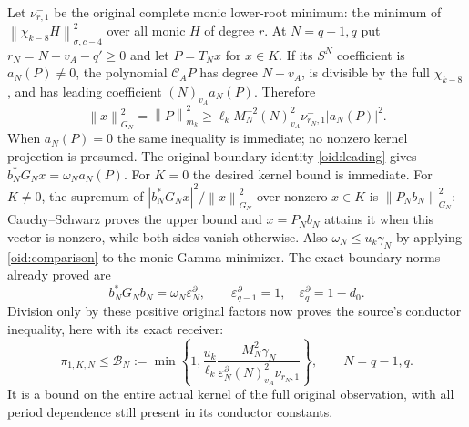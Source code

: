 \documentclass[11pt,a4paper]{article}
\newcommand{\norm}[1]{\left\lVert#1\right\rVert}
\begin{document}
Let $\nu^-_{r,1}$ be the original complete monic lower-root minimum:
the minimum of
$\norm{\chi_{k-8}H}_{\sigma,c-4}^2$ over all monic $H$ of degree
$r$. At $N=q-1,q$ put $r_N=N-v_A-q'\ge0$ and let
$P=T_Nx$ for $x\in K$. If its $S^N$ coefficient is $a_N(P)\ne0$,
the polynomial $\mathcal C_AP$ has degree $N-v_A$, is divisible
by the full $\chi_{k-8}$, and has leading coefficient
$(N)_{v_A}a_N(P)$. Therefore
\begin{equation}\label{oid:kernelcoefficient}
 \norm{x}_{G_N}^2=\norm P_{m_k}^2
 \ge\ell_k M_N^{-2}(N)_{v_A}^2
 \nu^-_{r_N,1}|a_N(P)|^2.
\end{equation}
When $a_N(P)=0$ the same inequality is immediate; no nonzero kernel
projection is presumed. The original boundary identity
\eqref{oid:leading} gives
$b_N^*G_Nx=\omega_Na_N(P)$.
For $K=0$ the desired kernel bound is immediate. For $K\ne0$, the
supremum of $|b_N^*G_Nx|^2/\norm x_{G_N}^2$ over nonzero
$x\in K$ is $\norm{P_Nb_N}_{G_N}^2$: Cauchy--Schwarz proves
the upper bound and $x=P_Nb_N$ attains it when this vector is
nonzero, while both sides vanish otherwise.
Also $\omega_N\le u_k\gamma_N$ by applying
\eqref{oid:comparison} to the monic Gamma minimizer.
The exact boundary norms already proved are
\[
 b_N^*G_Nb_N=\omega_N\varepsilon_N^\partial,
 \qquad\varepsilon_{q-1}^\partial=1,\quad
 \varepsilon_q^\partial=1-d_0.
\]
Division only by these positive original factors now proves the
source's conductor inequality, here with its exact receiver:
\begin{equation}\label{oid:finitepi}
 \boxed{\pi_{1,K,N}\le\mathcal B_N:=
 \min\left\{1,\frac{u_k}{\ell_k}
 \frac{M_N^2\gamma_N}
 {\varepsilon_N^\partial(N)_{v_A}^2\nu^-_{r_N,1}}\right\},
 \qquad N=q-1,q.}
\end{equation}
It is a bound on the entire actual kernel of the full original
observation, with all period dependence still present in its
conductor constants.
\end{document}
